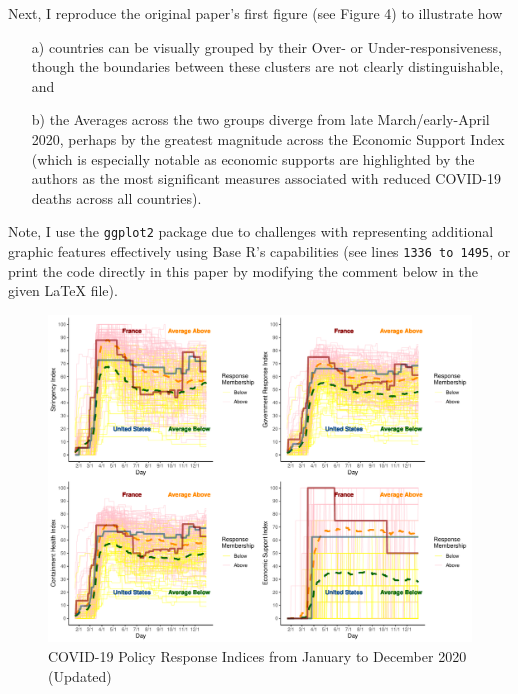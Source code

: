 \documentclass[12pt,letterpaper]{article}
\begin{document}
	

	
	
	\noindent Next, I reproduce the original paper's first figure (see Figure 4) to illustrate how 
	\begin{itemize}
		\item[a)] countries can be visually grouped by their Over- or Under-responsiveness, though the boundaries between these clusters are not clearly distinguishable, and
		\item[b)] the Averages across the two groups diverge from late March/early-April 2020, perhaps by the greatest magnitude across the Economic Support Index (which is especially notable as economic supports are highlighted by the authors as the most significant measures associated with reduced COVID-19 deaths across all countries).
	\end{itemize}
	
	\vspace{.25cm}
	
	\noindent Note, I use the \texttt{ggplot2} package due to challenges with representing additional graphic features effectively using Base R's capabilities (see lines \texttt{1336 to 1495}, or print the code directly in this paper by modifying the comment below in the given LaTeX file).
	
	
	\begin{figure}[h]
		\centering
		\includegraphics[width=1.05\textwidth]{all_plots1.pdf}
		\caption{COVID-19 Policy Response Indices from January to December 2020 (Updated)}
		\label{fig:figure1_new}
	\end{figure}
	
\end{document}
